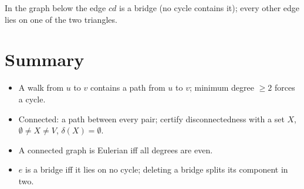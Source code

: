 \begin{example}
In the graph below the edge $cd$ is a bridge (no cycle contains it); every other edge lies on one
of the two triangles.
\begin{center}
\end{center}
\end{example}

\section{Summary}
\begin{itemize}
  \item A walk from $u$ to $v$ contains a path from $u$ to $v$; minimum degree $\ge 2$ forces a cycle.
  \item Connected: a path between every pair; certify disconnectedness with a set $X$, $\emptyset\neq X\neq V$, $\delta(X)=\emptyset$.
  \item A connected graph is Eulerian iff all degrees are even.
  \item $e$ is a bridge iff it lies on no cycle; deleting a bridge splits its component in two.
\end{itemize}
